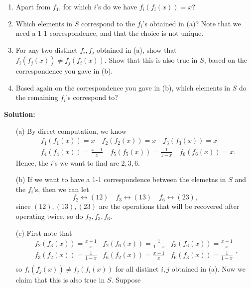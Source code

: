 \begin{enumerate}
    \begin{enumerate}
        \item Apart from $f_1$, for which $i$’s do we have $f_i(f_i(x)) = x$?
        \item Which elements in $S$ correspond to the $f_i$’s obtained in (a)?
              Note that we need a 1-1 correspondence, and that the choice is not unique.
        \item For any two distinct $f_i, f_j$ obtained in (a), show that
              $f_i(f_j(x)) \neq f_j(f_i(x))$. Show that this is also true in $S$,
              based on the correspondence you gave in (b).
        \item Based again on the correspondence you gave in (b), which elements in $S$
              do the remaining $f_i$’s correspond to?
    \end{enumerate}
    \textbf{Solution: } \vphantom{text}
    \begin{itemize}
        \item [(a)] By direct computation, we know 
        \begin{align*}
            &f_1(f_1(x)) = x \quad f_2(f_2(x)) = x \quad f_3(f_3(x)) = x \\
            &f_4(f_4(x)) = \frac{x-1}{x} \quad f_5(f_5(x)) = \frac{1}{1-x} \quad f_6(f_6(x)) = x.
        \end{align*}
        Hence, the \(i\)'s we want to find are \(2,3,6\).  
        \item [(b)] If we want to have a 1-1 correspondence between the elemetns in \(S\) and the \(f_i\)'s, then we can let 
        \[
            f_2 \leftrightarrow (12) \quad f_3 \leftrightarrow (13) \quad f_6 \leftrightarrow (23),
        \] since \((12), (13), (23)\) are the operations that will be recovered after operating twice, so do \(f_2, f_3, f_6\).  
        \item [(c)] First note that 
        \[
            \begin{array}{ccc}
                f_2(f_3(x)) = \frac{x-1}{x} & f_2(f_6(x)) = \frac{1}{1-x} & f_3(f_6(x)) = \frac{x-1}{x}  \\
                f_3(f_2(x)) = \frac{1}{1-x} & f_6(f_2(x)) = \frac{x-1}{x} & f_6(f_3(x)) = \frac{1}{1-x}  \\
            \end{array},
        \]
        so \(f_i(f_j(x)) \neq f_j(f_i(x))\) for all distinct \(i, j\) obtained in (a). Now we claim that this is also true in \(S\). Suppose 
        \begin{figure}[H]

\end{figure}
\end{itemize}
\end{enumerate}

